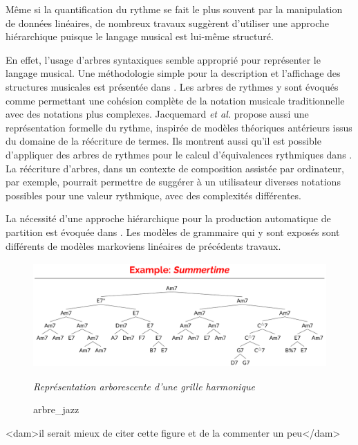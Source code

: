 Même si la quantification du rythme se fait le plus souvent par la
manipulation de données linéaires, de nombreux travaux suggèrent d’utiliser
une approche hiérarchique puisque le langage musical est lui-même structuré.


En effet, l’usage d’arbres syntaxiques semble approprié pour représenter le
langage musical. Une méthodologie simple pour la description et l'affichage des
structures musicales est présentée dans \cite{rythm_tree}. 
Les arbres de rythmes y sont évoqués comme permettant une cohésion complète de
la notation musicale traditionnelle avec des notations plus complexes.
Jacquemard \textit{et al.} \cite{jacquemard:hal-01134096} propose aussi une
représentation formelle du rythme, inspirée de modèles théoriques antérieurs
issus du domaine de la réécriture de termes. 
 Ils montrent aussi qu'il est possible d'appliquer des arbres de
rythmes pour le calcul d'équivalences rythmiques dans
\cite{jacquemard:hal-01403982}. La réécriture d’arbres, dans un contexte de
composition assistée par ordinateur, par exemple, pourrait permettre de
suggérer à un utilisateur diverses notations possibles pour une valeur
rythmique, avec des complexités différentes.

La nécessité d’une approche hiérarchique pour la production automatique de
partition est évoquée dans \cite{foscarin:hal-01988990}. 
Les modèles de grammaire qui y sont exposés sont différents de modèles
markoviens linéaires de précédents travaux.
\begin{figure}[h]
	\centering
	\includegraphics[height=40mm, width=120mm]{
    z_images/2_etat_de_l_art/1_summertime_tree.png}
	\caption{arbre\_jazz}
	\textit{Représentation arborescente d’une grille harmonique}
    \cite{harasimjazz}
\end{figure}
<dam>il serait mieux de citer cette figure et de la commenter un peu</dam>

